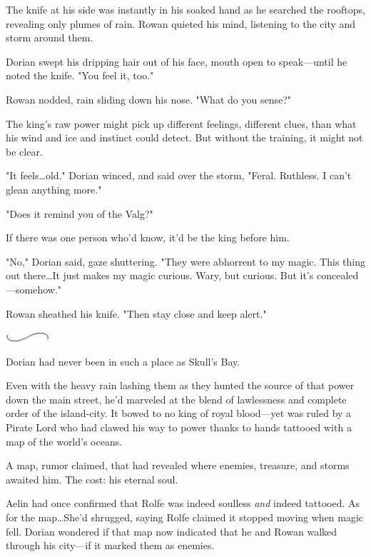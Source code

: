 The knife at his side was instantly in his soaked hand as he searched the rooftops, revealing only plumes of rain.
Rowan quieted his mind, listening to the city and storm around them.

Dorian swept his dripping hair out of his face, mouth open to speak---until he noted the knife.
"You feel it, too."

Rowan nodded, rain sliding down his nose.
"What do you sense?"

The king's raw power might pick up different feelings, different clues, than what his wind and ice and instinct could detect.
But without the training, it might not be clear.

"It feels\ldots old."
Dorian winced, and said over the storm, "Feral.
Ruthless.
I can't glean anything more."

"Does it remind you of the Valg?"

If there was one person who'd know, it'd be the king before him.

"No," Dorian said, gaze shuttering.
"They were abhorrent to my magic.
This thing out there\ldots It just makes my magic curious.
Wary, but curious.
But it's concealed---somehow."

Rowan sheathed his knife.
"Then stay close and keep alert."

\begin{center}
	\includegraphics[width=0.65in,height=0.13in]{images/seperator}
\end{center}

Dorian had never been in such a place as Skull's Bay.

Even with the heavy rain lashing them as they hunted the source of that power down the main street, he'd marveled at the blend of lawlessness and complete order of the island-city.
It bowed to no king of royal blood---yet was ruled by a Pirate Lord who had clawed his way to power thanks to hands tattooed with a map of the world's oceans.

A map, rumor claimed, that had revealed where enemies, treasure, and storms awaited him.
The cost: his eternal soul.

Aelin had once confirmed that Rolfe was indeed soulless \emph{and}
indeed tattooed.
As for the map\ldots She'd shrugged, saying Rolfe claimed it stopped moving when magic fell.
Dorian wondered if that map now indicated that he and Rowan walked through his city---if it marked them as enemies.

